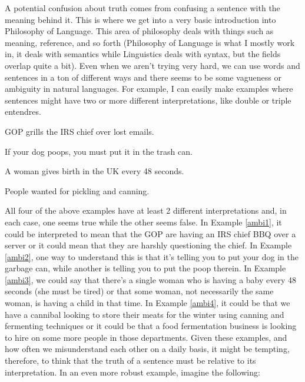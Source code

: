 A potential confusion about truth comes from confusing a sentence with the meaning behind it. This is where we get into a very basic introduction into Philosophy of Language. This area of philosophy deals with things such as meaning, reference, and so forth (Philosophy of Language is what I mostly work in, it deals with semantics while Linguistics deals with syntax, but the fields overlap quite a bit). Even when we aren't trying very hard, we can use words and sentences in a ton of different ways and there seems to be some vagueness or ambiguity in natural languages. For example, I can easily make examples where sentences might have two or more different interpretations, like double or triple entendres. 
\begin{earg}
\item[\ex{ambi1}] GOP grills the IRS chief over lost emails.
\item[\ex{ambi2}] If your dog poops, you must put it in the trash can.
\item[\ex{ambi3}] A woman gives birth in the UK every 48 seconds.
\item[\ex{ambi4}] People wanted for pickling and canning.
\end{earg}
All four of the above examples have at least 2 different interpretations and, in each case, one seems true while the other seems false. In Example \ref{ambi1}, it could be interpreted to mean that the GOP are having an IRS chief BBQ over a server or it could mean that they are harshly questioning the chief. In Example \ref{ambi2}, one way to understand this is that it's telling you to put your dog in the garbage can, while another is telling you to put the poop therein. In Example \ref{ambi3}, we could say that there's a single woman who is having a baby every 48 seconds (she must be tired) or that some woman, not necessarily the same woman, is having a child in that time. In Example \ref{ambi4}, it could be that we have a cannibal looking to store their meats for the winter using canning and fermenting techniques or it could be that a food fermentation business is looking to hire on some more people in those departments. Given these examples, and how often we misunderstand each other on a daily basis,  it might be tempting, therefore, to think that the truth of a sentence must be relative to its interpretation.  In an even more robust example, imagine the following:


